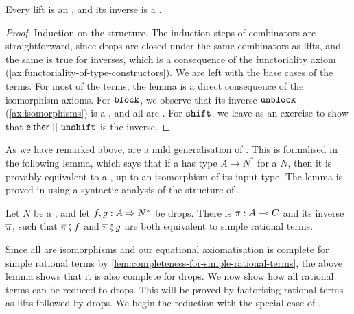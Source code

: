 \begin{lemma}\label{lem:lift-provable-inverse}
    Every lift is an , and its inverse is a . 
\end{lemma}
\begin{proof}
    Induction on the structure. The induction steps of combinators are straightforward, since drops are closed under the same combinators as lifts, and the same is true for inverses, which is a consequence of the functoriality axiom (\cref{ax:functoriality-of-type-constructors}). We are left with the base cases of the  terms.
    For most of the  terms, the lemma is a direct consequence of the isomorphism axioms. For $\mathtt{block}$, we observe that its inverse $\mathtt{unblock}$ (\cref{ax:isomorphisms}) is a , and all  are . For $\mathtt{shift}$, we leave as an exercise to show that $\mathsf{either}\ []\ \mathtt{unshift}$ is the inverse.
\end{proof}

As we have remarked above,  are a mild generalisation of .  This is formalised in the following lemma, which says that if a  has type $A \to N^*$ for a  $N$, then it is provably equivalent to a , up to an isomorphism of its input type. The lemma is proved in  using a syntactic analysis of the structure of .
\begin{lemma}\label{lem:joint-drops-normalisation} Let $N$ be a , and let  $
    f, g : A \Rightarrow N^*
$ be drops.
   There is $\pi : A \multimap C$ and its inverse $\overline \pi$, such  that $\inv \pi\comp{}f$ and $\inv \pi\comp{}g$ are both equivalent to simple rational terms.
\end{lemma}

Since all  are isomorphisms and our equational axiomatisation is complete for simple rational terms by \cref{lem:completeness-for-simple-rational-terms}, the above lemma shows that it is also complete for drops. We now show how all rational terms can be reduced to drops. This will be proved by factorising rational terms as lifts followed by drops. We begin the reduction with the special case of .

